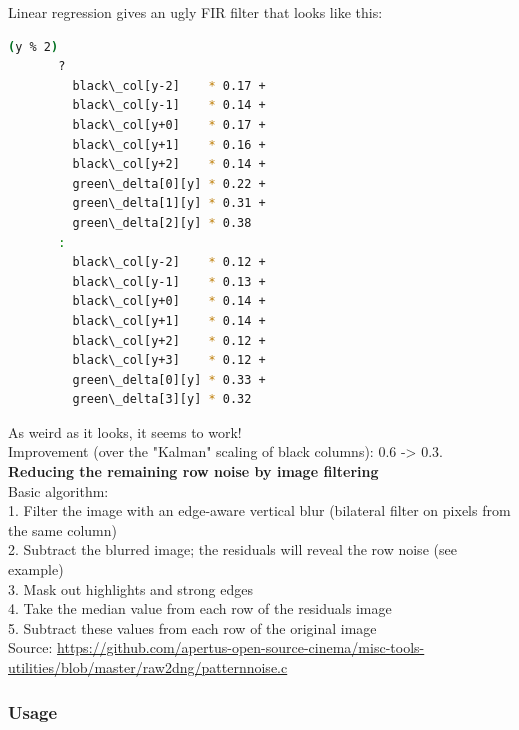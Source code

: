 Linear regression gives an ugly FIR filter that looks like this: \\

\begin{lstlisting}[language=bash,morekeywords=$,keywordstyle=\bfseries,frame=none,xleftmargin=.25in,belowskip=2em, aboveskip=2em]
    (y % 2)
       ?
         black\_col[y-2]    * 0.17 +
         black\_col[y-1]    * 0.14 +
         black\_col[y+0]    * 0.17 +
         black\_col[y+1]    * 0.16 +
         black\_col[y+2]    * 0.14 +
         green\_delta[0][y] * 0.22 +
         green\_delta[1][y] * 0.31 +
         green\_delta[2][y] * 0.38
       :
         black\_col[y-2]    * 0.12 +
         black\_col[y-1]    * 0.13 +
         black\_col[y+0]    * 0.14 +
         black\_col[y+1]    * 0.14 +
         black\_col[y+2]    * 0.12 +
         black\_col[y+3]    * 0.12 +
         green\_delta[0][y] * 0.33 +
         green\_delta[3][y] * 0.32
\end{lstlisting}

As weird as it looks, it seems to work!\\

Improvement (over the "Kalman" scaling of black columns): 0.6 -> 0.3.\\ 



\textbf{Reducing the remaining row noise by image filtering}\\

Basic algorithm:\\

1. Filter the image with an edge-aware vertical blur (bilateral filter on pixels from the same column)\\
2. Subtract the blurred image; the residuals will reveal the row noise (see example)\\
3. Mask out highlights and strong edges\\
4. Take the median value from each row of the residuals image\\
5. Subtract these values from each row of the original image \\

Source: \href{https://github.com/apertus-open-source-cinema/misc-tools-utilities/blob/master/raw2dng/patternnoise.c}{https://github.com/apertus-open-source-cinema/misc-tools-utilities/blob/master/raw2dng/patternnoise.c} \\





\subsubsection{Usage}

